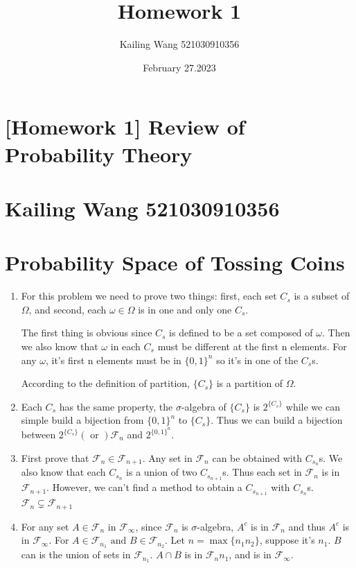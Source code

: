 \documentclass{article}
\theoremstyle{definition}
\begin{document}
	\title{Homework 1}
	\author{Kailing Wang 521030910356}
	\date{February 27.2023}
	
	\section*{\LARGE [Homework 1] Review of Probability Theory}
	\section*{\large Kailing Wang 521030910356}
	
	\section*{Probability Space of Tossing Coins}
	\begin{enumerate}
		\item For this problem we need to prove two things: first, each set $C_s$ is a subset of $\Omega$, and second, each $\omega \in \Omega$ is in one and only one $C_s$.
		
		The first thing is obvious since $C_s$ is defined to be a set composed of $\omega$. Then we also know that $\omega$ in each $C_s$ must be different at the first n elements. For any $\omega$, it's first n elements must be in $\{0, 1\}^n$ so it's in one of the $C_s$s. 
		
		According to the definition of partition, $\{C_s\}$ is a partition of $\Omega$.
		
		\item Each $C_s$ has the same property, the $\sigma$-algebra of $\{C_s\}$ is $2^{\{C_s\}}$ while we can simple build a bijection from $\{0,1\}^n$ to $\{C_s\}$. Thus we can build a bijection between $2^{\{C_s\}}(\text{ or })\mathcal{F}_n$ and $2^{\{0,1\}^n}$.
		
		\item First prove that $\mathcal F_n \in \mathcal F_{n+1}$. Any set in $\mathcal F_n$ can be obtained with $C_{s_n}$s. We also know that each $C_{s_n}$ is a union of two $C_{s_{n+1}}$s. Thus each set in $\mathcal F_n$ is in $\mathcal F_{n+1}$. However, we can't find a method to obtain a $C_{s_{n+1}}$ with $C_{s_n}$s. $\mathcal F_n \subsetneq \mathcal F_{n+1}$
		
		\item For any set $A \in \mathcal F_n$ in $\mathcal F_\infty$, since $\mathcal F_n$ is $\sigma$-algebra, $A^c$ is in $\mathcal F_n$ and thus $A^c$ is in $\mathcal F_\infty$. For $A \in \mathcal F_{n_1} \text{ and } B \in \mathcal F_{n_2}$. Let $n = \max\{n_1 n_2\}$, suppose it's $n_1$. $B$ can is the union of sets in $\mathcal F_{n_1}$. $A \cap B$ is in $\mathcal F_n{n_1}$, and is in $\mathcal F_\infty$. 
		

\end{enumerate}
\end{document}
